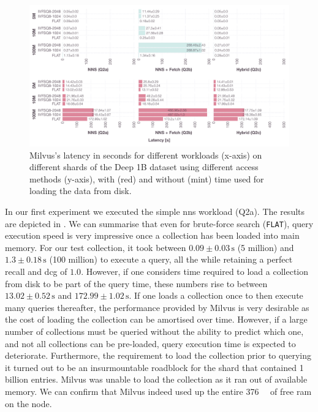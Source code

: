 \begin{landscape}
    \begin{figure}[p]
        \includegraphics[width=1.6\textwidth]{figures/bignns/milvus/bignns-milvus}
        \caption{Milvus's latency in seconds for different workloads (x-axis) on different shards of the Deep 1B dataset using different access methods (y-axis), with (red) and without (mint) time used for loading the data from disk.}
        \label{figure:milvus_runtime}
    \end{figure}
\end{landscape}

In our first experiment we executed the simple \acrshort{nns} workload (Q2a). The results are depicted in . We can summarise that even for brute-force search (\texttt{FLAT}), query execution speed is very impressive once a collection has been loaded into main memory. For our test collection, it took between $0.09 \pm 0.03 \, \si{\second}$ (5 million) and $1.3 \pm 0.18 \, \si{\second}$ (100 million) to execute a query, all the while retaining a perfect recall and \acrshort{dcg} of $1.0$. However, if one considers time required to load a collection from disk to be part of the query time, these numbers rise to between $13.02 \pm 0.52 \, \si{\second}$ and $172.99 \pm 1.02 \, \si{\second}$. If one loads a collection once to then execute many queries thereafter, the performance provided by Milvus is very desirable as the cost of loading the collection can be amortised over time. However, if a large number of collections must be queried without the ability to predict which one, and not all collections can be pre-loaded, query execution time is expected to deteriorate. Furthermore, the requirement to load the collection prior to querying it turned out to be an insurmountable roadblock for the shard that contained 1 billion entries. Milvus was unable to load the collection as it ran out of available memory. We can confirm that Milvus indeed used up the entire \SI{376}{\giga\byte} of free \acrshort{ram} on the node.

